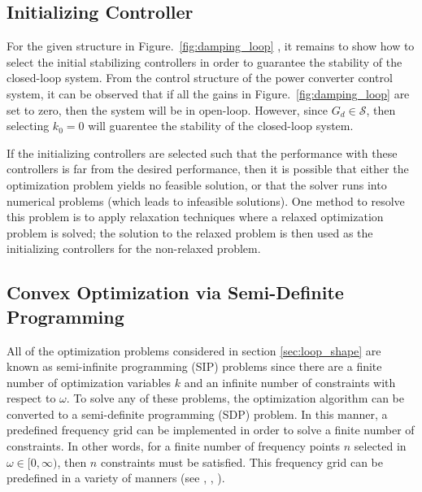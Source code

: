 \documentclass[a4paper, 10pt, conference]{ieeeconf}
\begin{document}
\subsection{Initializing Controller}
For the given structure in Figure.~\ref{fig:damping_loop} , it remains to show how to select the initial stabilizing controllers in order to guarantee the stability of the closed-loop system. From the control structure of the power converter control system, it can be observed that if all the gains in Figure.~\ref{fig:damping_loop} are set to zero, then the system will be in open-loop. However, since $G_d \in \mathscr{S}$, then selecting $k_0 = 0$ will guarentee the stability of the closed-loop system. 

If the initializing controllers are selected such that the performance with these controllers is far from the desired performance, then it is possible that either the optimization problem yields no feasible solution, or that the solver runs into numerical problems (which leads to infeasible solutions). One method to resolve this problem is to apply relaxation techniques where a relaxed optimization problem is solved; the solution to the relaxed problem is then used as the initializing controllers for the non-relaxed problem. 


\subsection{Convex Optimization via Semi-Definite Programming}
All of the optimization problems considered in section \ref{sec:loop_shape} are known as semi-infinite programming (SIP) problems since there are a finite number of optimization variables $k$ and an infinite number of constraints with respect to $\omega$. To solve any of these problems, the optimization algorithm can be converted to a semi-definite programming (SDP) problem. In this manner, a predefined frequency grid can be implemented in order to solve a finite number of constraints. In other words, for a finite number of frequency points $n$ selected in $\omega \in [0,\infty)$, then $n$ constraints must be satisfied. This frequency grid can be predefined in a variety of manners (see \cite{SVBB11}, \cite{GKL10b}, \cite{FR05}). 
\end{document}
